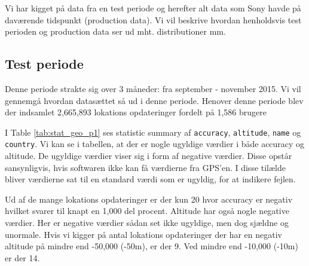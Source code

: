 Vi har kigget på data fra en test periode og herefter alt data som Sony havde på daværende tidspunkt (production data). Vi vil beskrive hvordan henholdsvis test perioden og production data ser ud mht. distributioner mm. 

\subsection{Test periode}
Denne periode strakte sig over 3 måneder: fra september - november 2015. Vi vil gennemgå hvordan datasættet så ud i denne periode. 
Henover denne periode blev der indsamlet 2,665,893 lokations opdateringer fordelt på 1,586 brugere

I Table \ref{tab:stat_geo_p1} ses statistic summary af \texttt{accuracy}, \texttt{altitude}, \texttt{name} og \texttt{country}.
Vi kan se i tabellen, at der er nogle ugyldige værdier i både accuracy og altitude. De ugyldige værdier viser sig i form af negative værdier. Disse opstår sansynligvis, hvis softwaren ikke kan få værdierne fra GPS'en. I disse tilælde bliver værdierne sat til en standard værdi som er ugyldig, for at indikere fejlen. 

Ud af de mange lokations opdateringer er der kun 20 hvor accuracy er negativ hvilket svarer til knapt en 1,000 del procent. Altitude har også nogle negative værdier. Her er negative værdier sådan set ikke ugyldige, men dog sjældne og unormale. Hvis vi kigger på antal lokations opdateringer der har en negativ altitude på mindre end -50,000 (-50m), er der 9. Ved mindre end -10,000 (-10m) er der 14.

